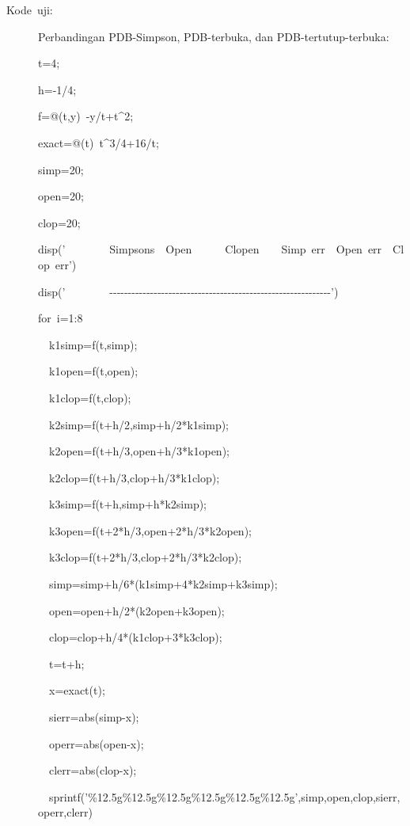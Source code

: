 \begin{description}
\item [{Kode\ uji:}] \label{ans:testCode}Perbandingan PDB-Simpson, PDB-terbuka,
dan PDB-tertutup-terbuka:

\begin{lyxcode}
t=4;

h=-1/4;

f=@(t,y)~-y/t+t\textasciicircum 2;

exact=@(t)~t\textasciicircum 3/4+16/t;

simp=20;

open=20;

clop=20;

disp('~~~~~~~~Simpsons~~Open~~~~~~Clopen~~~~Simp~err~~Open~err~~Clop~err')

disp('~~~~~~~~-{}-{}-{}-{}-{}-{}-{}-{}-{}-{}-{}-{}-{}-{}-{}-{}-{}-{}-{}-{}-{}-{}-{}-{}-{}-{}-{}-{}-{}-{}-{}-{}-{}-{}-{}-{}-{}-{}-{}-{}-{}-{}-{}-{}-{}-{}-{}-{}-{}-{}-{}-{}-{}-{}-{}-{}-{}-{}-{}-')

for~i=1:8

~~k1simp=f(t,simp);

~~k1open=f(t,open);

~~k1clop=f(t,clop);

~~k2simp=f(t+h/2,simp+h/2{*}k1simp);

~~k2open=f(t+h/3,open+h/3{*}k1open);

~~k2clop=f(t+h/3,clop+h/3{*}k1clop);

~~k3simp=f(t+h,simp+h{*}k2simp);

~~k3open=f(t+2{*}h/3,open+2{*}h/3{*}k2open);

~~k3clop=f(t+2{*}h/3,clop+2{*}h/3{*}k2clop);

~~simp=simp+h/6{*}(k1simp+4{*}k2simp+k3simp);

~~open=open+h/2{*}(k2open+k3open);

~~clop=clop+h/4{*}(k1clop+3{*}k3clop);

~~t=t+h;

~~x=exact(t);

~~sierr=abs(simp-x);

~~operr=abs(open-x);

~~clerr=abs(clop-x);

~~sprintf('\%12.5g\%12.5g\%12.5g\%12.5g\%12.5g\%12.5g',simp,open,clop,sierr,operr,clerr)


\end{lyxcode}
\end{description}

